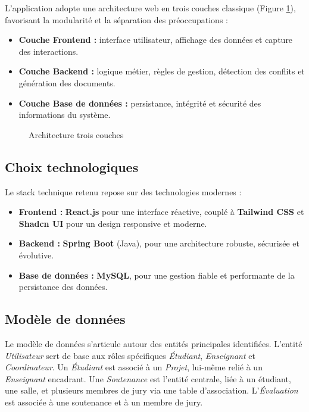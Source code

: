 \documentclass[12pt,a4paper]{article}
\begin{document}
L'application adopte une architecture web en trois couches classique
(Figure \ref{fig:architecture}), favorisant la modularité et la séparation des
préoccupations :

\begin{itemize}[label=\textcolor{primary}{\textbullet}]
    \item \textbf{Couche Frontend :} interface utilisateur, affichage des données
          et capture des interactions.
    \item \textbf{Couche Backend :} logique métier, règles de gestion, détection
          des conflits et génération des documents.
    \item \textbf{Couche Base de données :} persistance, intégrité et sécurité
          des informations du système.
\end{itemize}

\begin{figure}[H]
    \centering
    \caption{Architecture trois couches}
    \label{fig:architecture}
\end{figure}

\subsection{Choix technologiques}
\label{subsec:stack}

Le stack technique retenu repose sur des technologies modernes :

\begin{itemize}[label=\textcolor{primary}{\textbullet}]
    \item \textbf{Frontend :} \textbf{React.js} pour une interface réactive,
          couplé à \textbf{Tailwind CSS} et \textbf{Shadcn UI} pour un design responsive et moderne.
    \item \textbf{Backend :} \textbf{Spring Boot} (Java), pour une architecture
          robuste, sécurisée et évolutive.
    \item \textbf{Base de données :} \textbf{MySQL}, pour une gestion fiable
          et performante de la persistance des données.
\end{itemize}

\subsection{Modèle de données}
\label{subsec:modele_donnees}

Le modèle de données s'articule autour des entités principales identifiées.
L'entité \textit{Utilisateur} sert de base aux rôles spécifiques
\textit{Étudiant}, \textit{Enseignant} et \textit{Coordinateur}. Un
\textit{Étudiant} est associé à un \textit{Projet}, lui-même relié à un
\textit{Enseignant} encadrant. Une \textit{Soutenance} est l'entité centrale,
liée à un étudiant, une salle, et plusieurs membres de jury via une table
d'association. L'\textit{Évaluation} est associée à une soutenance et à un
membre de jury.
\end{document}
